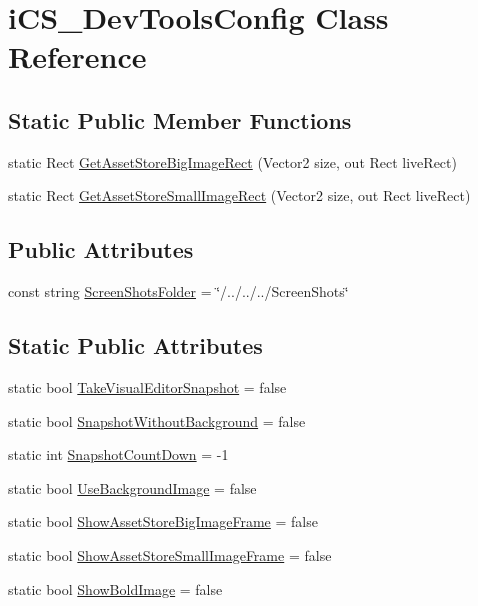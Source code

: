 \hypertarget{classi_c_s___dev_tools_config}{\section{i\+C\+S\+\_\+\+Dev\+Tools\+Config Class Reference}
\label{classi_c_s___dev_tools_config}
}
\subsection*{Static Public Member Functions}
\begin{DoxyCompactItemize}
\item 
static Rect \hyperlink{classi_c_s___dev_tools_config_a801b61050a71680cc52888c745bc314e}{Get\+Asset\+Store\+Big\+Image\+Rect} (Vector2 size, out Rect live\+Rect)
\item 
static Rect \hyperlink{classi_c_s___dev_tools_config_a61731230029047eadbc944e2d9ec8772}{Get\+Asset\+Store\+Small\+Image\+Rect} (Vector2 size, out Rect live\+Rect)
\end{DoxyCompactItemize}
\subsection*{Public Attributes}
\begin{DoxyCompactItemize}
\item 
const string \hyperlink{classi_c_s___dev_tools_config_a2210db4b899fd11559c1776beea61f60}{Screen\+Shots\+Folder} = \char`\"{}/../../../Screen\+Shots\char`\"{}
\end{DoxyCompactItemize}
\subsection*{Static Public Attributes}
\begin{DoxyCompactItemize}
\item 
static bool \hyperlink{classi_c_s___dev_tools_config_a6c117bb70d526d278bd300b65e34b955}{Take\+Visual\+Editor\+Snapshot} = false
\item 
static bool \hyperlink{classi_c_s___dev_tools_config_a933a2e9464d675b9f9d7cee3cb2b9b92}{Snapshot\+Without\+Background} = false
\item 
static int \hyperlink{classi_c_s___dev_tools_config_a41c2d1234e77117f93eec81ff275e3a2}{Snapshot\+Count\+Down} = -\/1
\item 
static bool \hyperlink{classi_c_s___dev_tools_config_aadfbbdb943668a31252fcfe7a15b9890}{Use\+Background\+Image} = false
\item 
static bool \hyperlink{classi_c_s___dev_tools_config_a6f6213426b4000e7a6339241d955e54a}{Show\+Asset\+Store\+Big\+Image\+Frame} = false
\item 
static bool \hyperlink{classi_c_s___dev_tools_config_a2fe8bcb8419ef43405eb7873e36e898e}{Show\+Asset\+Store\+Small\+Image\+Frame} = false
\item 
static bool \hyperlink{classi_c_s___dev_tools_config_afbc82a567b71bd65b40a5da5b0ab9890}{Show\+Bold\+Image} = false
\end{DoxyCompactItemize}
